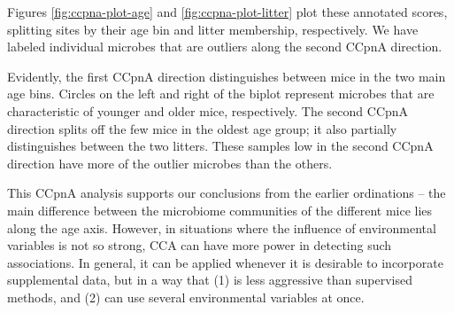 \begin{knitrout}
\color{fgcolor}
\end{knitrout}

Figures \ref{fig:ccpna-plot-age} and \ref{fig:ccpna-plot-litter} plot these
annotated scores, splitting sites by their age bin and litter
membership, respectively. We have labeled individual microbes that are
outliers along the second CCpnA direction.

Evidently, the first CCpnA direction distinguishes between mice
in the two main age bins. Circles on the left and right of the biplot
represent microbes that are characteristic of younger and older mice,
respectively. The second CCpnA direction splits off the few mice
in the oldest age group; it also partially distinguishes between the two
litters. These samples low in the second CCpnA direction have more of
the outlier microbes than the others.

This CCpnA analysis supports our conclusions from the earlier
ordinations -- the main difference between the microbiome communities
of the  different mice lies along the age axis. However, in situations
where the influence of environmental variables is not so strong, CCA
can have more power in detecting such associations. In general, it
can be applied whenever it is desirable to incorporate
supplemental data, but in a way that (1) is less aggressive than
supervised methods, and (2) can use several environmental variables at
once.

